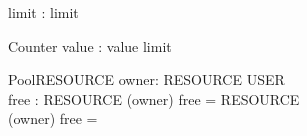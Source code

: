 \documentclass{llncs}
\begin{document}
\begin{axdef}
limit : \nat
\where
limit 
\end{axdef}

\begin{schema}{Counter}
value : \nat
\where
value \leq limit
\end{schema}

\begin{genschema}{Pool}{RESOURCE}
owner: RESOURCE \pfun USER \\
free : \power RESOURCE
\where
(\dom owner) \uni free = RESOURCE \\
(\dom owner) \int free = \emptyset
\end{genschema}
\end{document}
